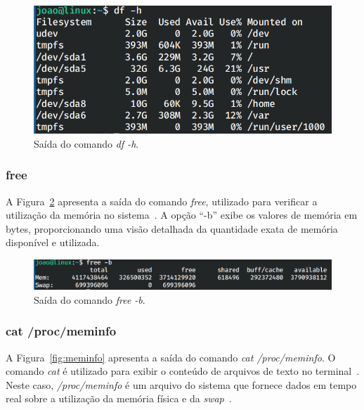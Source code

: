 \documentclass[
	12pt,				%
	oneside,   	        %
	a4paper,			%
	english,			%
	french,				%
	spanish,			%
	brazil,				%
	]{pacotes/abntex2}
\begin{document}
\begin{figure}[H]
  \centering
  \includegraphics[scale=0.5]{figuras/df.png}
  \caption{Saída do comando \textit{df -h}.}
  \label{fig:df}
\end{figure}

\subsubsection{free}
A Figura~\ref{fig:free} apresenta a saída do comando \textit{free}, utilizado para verificar a utilização da memória no sistema~\cite{shotts2017}. A opção ``-b'' exibe os valores de memória em bytes, proporcionando uma visão detalhada da quantidade exata de memória disponível e utilizada.

\begin{figure}[H]
  \centering
  \includegraphics[scale=0.5]{figuras/free.png}
  \caption{Saída do comando \textit{free -b}.}
  \label{fig:free}
\end{figure}

\subsubsection{cat /proc/meminfo}
A Figura~\ref{fig:meminfo} apresenta a saída do comando \textit{cat /proc/meminfo}. O comando \textit{cat} é utilizado para exibir o conteúdo de arquivos de texto no terminal~\cite{shotts2017}. Neste caso, \textit{/proc/meminfo} é um arquivo do sistema que fornece dados em tempo real sobre a utilização da memória física e da \textit{swap}~\cite{tldpProc}.
\end{document}
